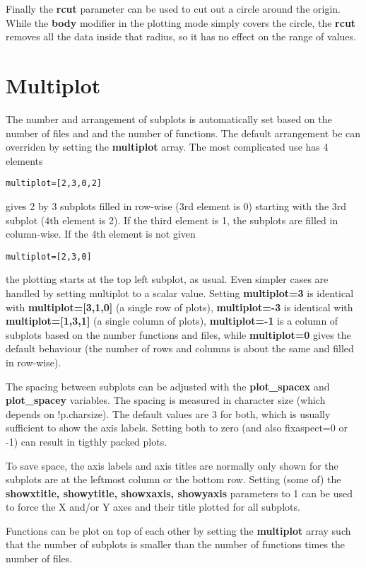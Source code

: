 \documentclass{article}
\begin{document}
Finally the {\bf rcut} parameter can be used to cut out a circle around
the origin. While the {\bf body} modifier in the plotting mode simply covers
the circle, the {\bf rcut} removes all the data inside that radius,
so it has no effect on the range of values.

\section{Multiplot \label{s-multiplot}}

The number and arrangement of subplots is automatically set based 
on the number of files and and the number of functions. 
The default arrangement be can overriden by setting the
{\bf multiplot} array. The most complicated use has 4 elements
\begin{verbatim}
multiplot=[2,3,0,2]
\end{verbatim} 
gives 2 by 3 subplots filled in row-wise (3rd element is 0) 
starting with the 3rd subplot (4th element is 2). If the third element is 1,
the subplots are filled in column-wise. If the 4th element is not given 
\begin{verbatim}
multiplot=[2,3,0]
\end{verbatim} 
the plotting starts at the top left subplot, as usual. Even simpler
cases are handled by setting multiplot to a scalar value.
Setting {\bf multiplot=3} is identical with {\bf multiplot=[3,1,0]} 
(a single row of plots), {\bf multiplot=-3} is identical with 
{\bf multiplot=[1,3,1]} (a single column of plots), 
{\bf multiplot=-1} is a column of subplots based on the number 
functions and files, while {\bf multiplot=0} gives the default
behaviour (the number of rows and columns is about the same and
filled in row-wise).

The spacing between subplots can be adjusted with the
{\bf plot\_spacex} and {\bf plot\_spacey} variables.
The spacing is measured in character size (which depends on !p.charsize).
The default values are 3 for both, which is usually sufficient to
show the axis labels. Setting both to zero (and also fixaspect=0 or -1)
can result in tigthly packed plots. 

To save space, the axis labels and axis titles are normally only shown 
for the subplots are at the leftmost column or the bottom row.
Setting (some of) the {\bf showxtitle, showytitle, showxaxis, showyaxis} 
parameters to 1 can be used to force the X and/or Y axes and their title plotted
for all subplots.

Functions can be plot on top of each other by setting the {\bf multiplot}
array such that the number of subplots is smaller than the number of
functions times the number of files.  
\end{document}
